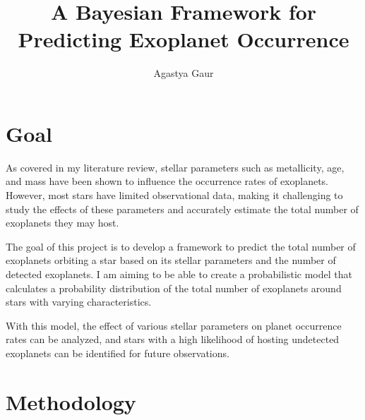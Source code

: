 \documentclass[preprint]{aastex631}
\begin{document}
\title{A Bayesian Framework for Predicting Exoplanet Occurrence}
\author{Agastya Gaur}

\section{Goal}
As covered in my literature review, stellar parameters such as metallicity, age, and mass have been shown to influence the occurrence rates of exoplanets. However, most stars have limited observational data, making it challenging to study the effects of these parameters and accurately estimate the total number of exoplanets they may host.

The goal of this project is to develop a framework to predict the total number of exoplanets orbiting a star based on its stellar parameters and the number of detected exoplanets. I am aiming to be able to create a probabilistic model that calculates a probability distribution of the total number of exoplanets around stars with varying characteristics.

With this model, the effect of various stellar parameters on planet occurrence rates can be analyzed, and stars with a high likelihood of hosting undetected exoplanets can be identified for future observations.

\section{Methodology}
\end{document}
